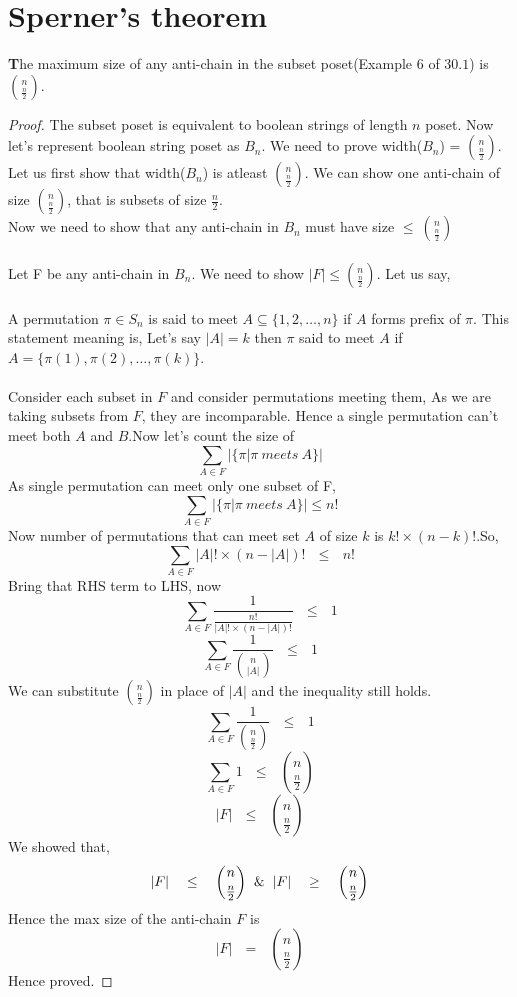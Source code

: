 \section{{Sperner's theorem}}
\begin{theorem}
\textbf The maximum size of any anti-chain in the subset poset(Example $6$ of $30.1$) is $n \choose \frac{n}{2}$.
\begin{proof}
The subset poset is equivalent to boolean strings of length $n$ poset. Now let's represent boolean string poset as $B_n$. We need to prove width($B_n$) = $n \choose \frac{n}{2}$.\\
Let us first show that width($B_n$) is atleast $n \choose \frac{n}{2}$. We can show one anti-chain of size $n \choose \frac{n}{2}$, that is subsets of size $\frac{n}{2}.$\\
Now we need to show that any anti-chain in $B_n$ must have size $\leq ~{n \choose \frac{n}{2}}$\\\\
Let F be any anti-chain in $B_n$. We need to show $|F| \leq {n \choose \frac{n}{2}}$. Let us say,\\\\
A permutation $\pi \in S_n$ is said to meet $A \subseteq \{1,2,\ldots,n\}$ if $A$ forms prefix of $\pi$. This statement meaning is, Let's say $|A| = k$ then $\pi$ said to meet $A$ if $A = \{\pi(1),\pi(2),\ldots,\pi(k)\}$.\\\\

Consider each subset in $F$ and consider permutations meeting them, As we are taking subsets from $F$, they are incomparable. Hence a single permutation can't meet both $A$ and $B$.Now let's count the size of
$$\sum_{A\in F} \bigg|\{\pi | \pi ~meets~ A\}\bigg|$$
As single permutation can meet only one subset of F,
$$\sum_{A\in F} \bigg|\{\pi | \pi ~meets~ A\}\bigg| \leq n!$$
Now number of permutations that can meet set $A$ of size $k$ is $k! \times (n-k)!$.So,
$$\sum_{A\in F} |A|! \times (n-|A|)! ~~~\leq~~~ n!$$
Bring that RHS term to LHS, now 
$$\sum_{A\in F} \frac{1}{\frac{n!}{|A|! \times (n-|A|)!}} ~~~\leq~~~ 1$$
$$\sum_{A\in F} \frac{1}{{n \choose {|A|}}} ~~~ \leq ~~~ 1$$
We can substitute $n \choose \frac{n}{2}$ in place of $|A|$ and the inequality still holds.
$$\sum_{A\in F} \frac{1}{{n \choose \frac{n}{2}}} ~~~ \leq ~~~ 1$$
$$\sum_{A\in F} 1  ~~~ \leq ~~~ {n \choose \frac{n}{2}}$$
$$|F| ~~~\leq~~~ {n \choose \frac{n}{2}}$$
We showed that,
$$|F| ~~~\leq~~~ {n \choose \frac{n}{2}} \And |F| ~~~\geq~~~ {n \choose \frac{n}{2}}$$
Hence the max size of the anti-chain $F$ is 
$$|F| ~~~=~~~ {n \choose \frac{n}{2}} $$
Hence proved.
\end{proof}
\end{theorem}




